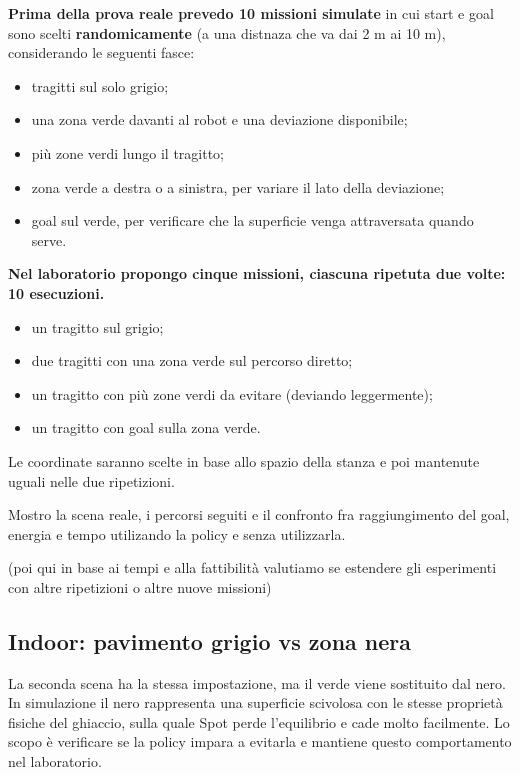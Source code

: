 \documentclass[11pt,a4paper]{article}
\begin{document}
\textbf{Prima della prova reale prevedo 10 missioni simulate} in cui start e goal sono scelti \textbf{randomicamente} (a una distnaza che va dai 2 m ai 10 m), considerando le seguenti fasce:

\begin{itemize}
\item tragitti sul solo grigio;
\item una zona verde davanti al robot e una deviazione disponibile;
\item più zone verdi lungo il tragitto;
\item zona verde a destra o a sinistra, per variare il lato della deviazione;
\item goal sul verde, per verificare che la superficie venga attraversata quando serve.
\end{itemize}


\textbf{Nel laboratorio propongo cinque missioni, ciascuna ripetuta due volte: 10 esecuzioni.}
\begin{itemize}
\item un tragitto sul grigio;
\item due tragitti con una zona verde sul percorso diretto;
\item un tragitto con più zone verdi da evitare (deviando leggermente);
\item un tragitto con goal sulla zona verde.
\end{itemize}

Le coordinate saranno scelte in base allo spazio della stanza e poi mantenute uguali nelle due ripetizioni.

Mostro la scena reale, i percorsi seguiti e il confronto fra raggiungimento del goal, energia e tempo utilizando la policy e senza utilizzarla. 

(poi qui in base ai tempi e alla fattibilità valutiamo se estendere gli esperimenti con altre ripetizioni o altre nuove missioni)

\subsection{Indoor: pavimento grigio vs zona nera}

La seconda scena ha la stessa impostazione, ma il verde viene sostituito dal nero.
In simulazione il nero rappresenta una superficie scivolosa con le stesse proprietà fisiche del ghiaccio, sulla quale Spot perde l'equilibrio e cade molto facilmente.
Lo scopo è verificare se la policy impara a evitarla e mantiene questo comportamento nel laboratorio.
\end{document}
